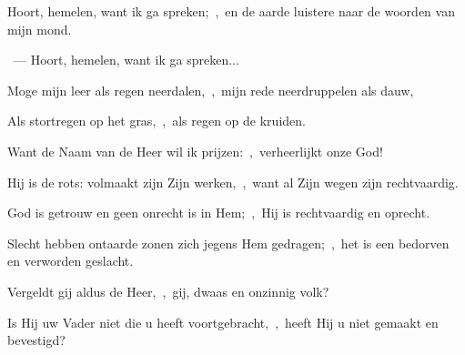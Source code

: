 \documentclass[12pt,twoside,a5paper]{article}
\begin{document}

\begin{halfparskip}

   Hoort, hemelen, want ik ga spreken;~\sep\ en de aarde luistere naar de woorden van mijn mond.

  ~---  Hoort, hemelen, want ik ga spreken...

  Moge mijn leer als regen neerdalen,~\sep\ mijn rede neerdruppelen als dauw,

  Als stortregen op het gras,~\sep\ als regen op de kruiden.

  Want de Naam van de Heer wil ik prijzen:~\sep\ verheerlijkt onze God!
\end{halfparskip}

\begin{halfparskip}

  Hij is de rots: volmaakt zijn Zijn werken,~\sep\ want al Zijn wegen zijn rechtvaardig.

  God is getrouw en geen onrecht is in Hem;~\sep\ Hij is rechtvaardig en oprecht.

  Slecht hebben ontaarde zonen zich jegens Hem gedragen;~\sep\ het is een bedorven en verworden geslacht.

  Vergeldt gij aldus de Heer,~\sep\ gij, dwaas en onzinnig volk?

  Is Hij uw Vader niet die u heeft voortgebracht,~\sep\ heeft Hij u niet gemaakt en bevestigd?
\end{halfparskip}
\end{document}
